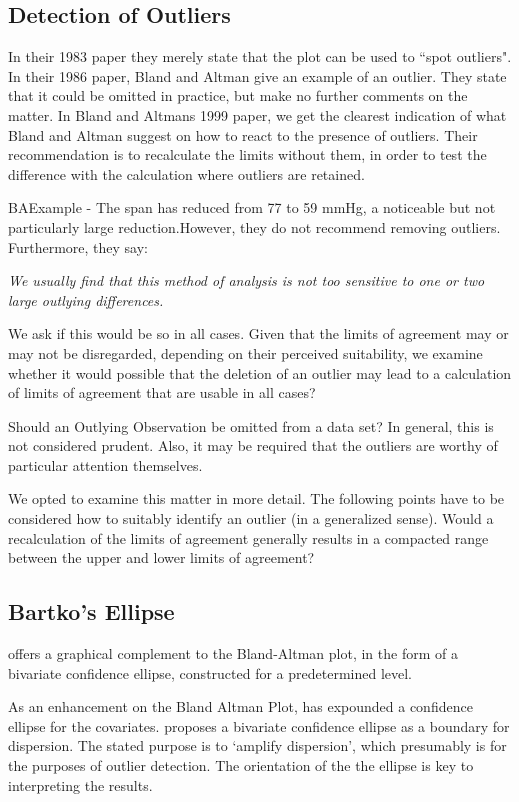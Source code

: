 \documentclass[12pt, a4paper]{report}
\theoremstyle{plain}
\theoremstyle{definition}
\theoremstyle{remark}
\begin{document}
\subsection{Detection of Outliers}
In their 1983 paper they merely state that the plot can be used to
``spot outliers". In  their 1986 paper, Bland and Altman give an example of an
outlier. They state that it could be omitted in practice, but make
no further comments on the matter. In Bland and Altmans 1999 paper, we get the clearest indication of
what Bland and Altman suggest on how to react to the presence of
outliers. Their recommendation is to recalculate the limits
without them, in order to test the difference with the calculation
where outliers are retained.

BAExample -	The span has reduced from 77 to 59 mmHg, a noticeable but not
particularly large reduction.However, they do not recommend removing outliers. Furthermore, they say:

\textit{We usually find that this method of analysis is not too sensitive
	to one or two large outlying differences.}

We ask if this would be so in all cases. Given that the limits of
agreement may or may not be disregarded, depending on their
perceived suitability, we examine whether it would possible that
the deletion of an outlier may lead to a calculation of limits of
agreement that are usable in all cases?

Should an Outlying Observation be omitted from a data set? In
general, this is not considered prudent. Also, it may be required that the outliers are worthy of particular attention themselves.

We opted to examine this
matter in more detail. The following points have to be considered how to suitably identify an outlier (in a generalized sense). Would a recalculation of the limits of agreement generally results in a compacted range between the upper and lower limits of agreement?

\subsection{Bartko's Ellipse}


\citet{Bartko} offers a graphical complement to the Bland-Altman
plot, in the form of a bivariate confidence ellipse, constructed for a
predetermined level.

As an enhancement on the Bland Altman Plot, \citet{Bartko} has
expounded a confidence ellipse for the covariates. \citet{Bartko} proposes
a bivariate confidence ellipse as a boundary for dispersion. The stated purpose is to `amplify dispersion', which presumably is for  the purposes of outlier detection. The orientation of the the ellipse is key to interpreting the results.
\end{document}
